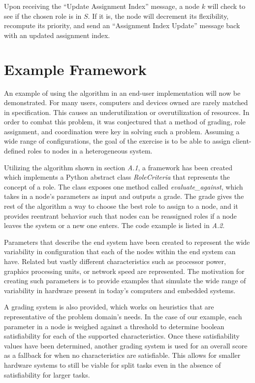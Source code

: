 \documentclass[11pt]{article}
\begin{document}
\begin{multicols}{2}
Upon receiving the ``Update Assignment Index'' message, a node $k$ will check to see if the chosen role is in $S$. If it is, the node will decrement its flexibility, recompute its priority, and send an ``Assignment Index Update'' message back with an updated assignment index.

\section{Example Framework}
An example of using the algorithm in an end-user implementation will now be demonstrated.  For many users, computers and devices owned are rarely matched in specification. This causes an underutilization or overutilization of resources.  In order to combat this problem, it was conjectured that a method of grading, role assignment, and coordination were key in solving such a problem.  Assuming a wide range of configurations, the goal of the exercise is to be able to assign client-defined roles to nodes in a heterogeneous system.

Utilizing the algorithm shown in section \textit{A.1}, a framework has been created which implements a Python abstract class \textit{RoleCriteria} that represents the concept of a role. The class exposes one method called \textit{evaluate\_against}, which takes in a node's parameters as input and outputs a grade. The grade gives the rest of the algorithm a way to choose the best role to assign to a node, and it provides reentrant behavior such that nodes can be reassigned roles if a node leaves the system or a new one enters.  The code example is listed in \textit{A.2}.

Parameters that describe the end system have been created to represent the wide variability in configuration that each of the nodes within the end system can have.  Related but vastly different characteristics such as processor power, graphics processing units, or network speed are represented.  The motivation for creating such parameters is to provide examples that simulate the wide range of variability in hardware present in today's computers and embedded systems.

A grading system is also provided, which works on heuristics that are representative of the problem domain's needs.  In the case of our example, each parameter in a node is weighed against a threshold to determine boolean satisfiability for each of the supported characteristics.  Once these satisfiability values have been determined, another grading system is used for an overall score as a fallback for when no characteristics are satisfiable.  This allows for smaller hardware systems to still be viable for split tasks even in the absence of satisfiability for larger tasks.


\end{multicols}
\end{document}
